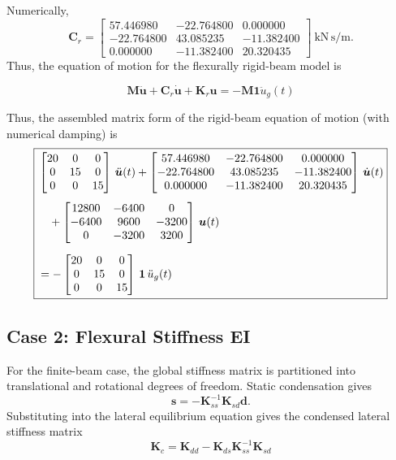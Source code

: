 \documentclass[11pt,a4paper]{article}
\begin{document}
Numerically,
\begin{equation}
\bm{C}_r=
\begin{bmatrix}
57.446980 & -22.764800 & 0.000000\\
-22.764800 & 43.085235 & -11.382400\\
0.000000 & -11.382400 & 20.320435
\end{bmatrix}
\ \mathrm{kN\,s/m}.
\end{equation} Thus, the equation of motion for the flexurally rigid-beam model is

\begin{equation}
\boxed{
\bm{M}\ddot{\bm{u}}+\bm{C}_r\dot{\bm{u}}+\bm{K}_r\bm{u}
=-\bm{M}\bm{1}\ddot{u}_g(t)
}
\label{eq:eom_rigid}
\end{equation}

Thus, the assembled matrix form of the rigid-beam equation of motion (with numerical damping) is
\begin{equation}
\boxed{%
\begin{aligned}
&\begin{bmatrix}20 & 0 & 0\\ 0 & 15 & 0\\ 0 & 0 & 15\end{bmatrix}\,\ddot{\bm{u}}(t)
+\begin{bmatrix}57.446980 & -22.764800 & 0.000000\\ -22.764800 & 43.085235 & -11.382400\\ 0.000000 & -11.382400 & 20.320435\end{bmatrix}\,\dot{\bm{u}}(t)\\[4pt]
&\quad +\begin{bmatrix}12800 & -6400 & 0\\ -6400 & 9600 & -3200\\ 0 & -3200 & 3200\end{bmatrix}\,\bm{u}(t)\\[6pt]
&= -\begin{bmatrix}20 & 0 & 0\\ 0 & 15 & 0\\ 0 & 0 & 15\end{bmatrix}\,\bm{1}\,\ddot{u}_g(t)
\end{aligned}%
}
\label{eq:M}
\end{equation}

\pagebreak
\subsection{Case 2: Flexural Stiffness EI}
For the finite-beam case, the global stiffness matrix is partitioned into translational and rotational degrees of freedom. Static condensation gives
\begin{equation}
\bm{s}=-\bm{K}_{ss}^{-1}\bm{K}_{sd}\bm{d}.
\end{equation}
Substituting into the lateral equilibrium equation gives the condensed lateral stiffness matrix
\begin{equation}
\boxed{
\bm{K}_c=\bm{K}_{dd}-\bm{K}_{ds}\bm{K}_{ss}^{-1}\bm{K}_{sd}
}
\label{eq:condensation}
\end{equation}
\end{document}
